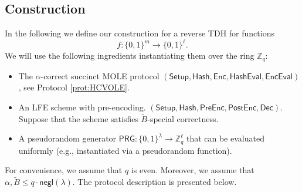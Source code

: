 \documentclass{theoretics}
\newcommand{\Pre}{\mathsf{Pre}}
\newcommand{\Post}{\mathsf{Post}}
\newcommand{\Z}{\mathbb{Z}}
\newcommand{\negl}{\mathsf{negl}}
\renewcommand{\sec}{\ensuremath{\lambda}}
\newcommand{\algofont}[1]{\ensuremath{\mathsf{#1}}}
\newcommand{\Enc}{{\algofont{Enc}}}
\newcommand{\Dec}{{\algofont{Dec}}}
\newcommand{\Setup}{{\algofont{Setup}}}
\newcommand{\Eval}{\algofont{Eval}\xspace}
\newcommand{\Hash}{{\algofont{Hash}}}
\begin{document}
\subsection{Construction}

In the following we define our construction for a reverse TDH for functions
\[
f: \{0,1\}^m \to \{0,1\}^\ell.
\]
We will use the following ingredients instantiating them over the ring $\Z_q$:
\begin{itemize}
    \item The $\alpha$-correct succinct MOLE protocol
     $(\Setup, \Hash, \Enc, \Hash\Eval, \Enc\Eval)$, see Protocol \ref{prot:HCVOLE}.
    \item An LFE scheme with pre-encoding.
     $(\Setup, \Hash, \Pre\Enc, \Post\Enc, \Dec)$. Suppose that the scheme satisfies $\widetilde{B}$-special correctness.
   \item A pseudorandom generator $\mathsf{PRG}:\{0, 1\}^\sec\rightarrow \Z_q^{\ell}$ that can be evaluated uniformly (e.g., instantiated via a pseudorandom function).
\end{itemize}
For convenience, we assume that $q$ is even. Moreover, we assume that $\alpha, \widetilde{B}\le q\cdot\negl(\sec)$. The protocol description is presented below.
\end{document}
